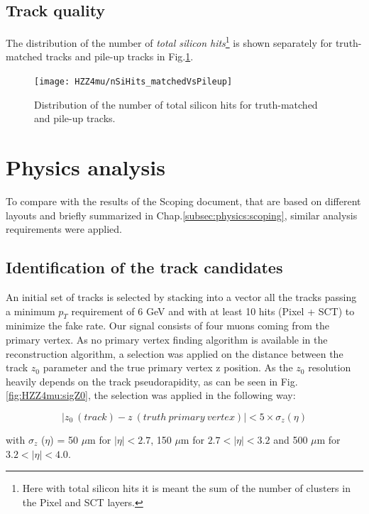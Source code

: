 \documentclass[a4paper,twoside,12pt]{book}
\begin{document}
\subsection*{Track quality}
The distribution of the number of \textit{total silicon hits}\footnote{Here with total silicon hits it is meant the sum of the number
of clusters in the Pixel and SCT layers.} is shown separately for truth-matched tracks and pile-up tracks in
Fig.\ref{fig:HZZ4mu:trackQuality}.

\begin{figure}
\centering
\texttt{[image: HZZ4mu/nSiHits\_matchedVsPileup]}
\caption{Distribution of the number of total silicon hits for truth-matched and pile-up tracks.}
\label{fig:HZZ4mu:trackQuality}
\end{figure}

\section{Physics analysis}\label{sec:physics:analysis}
To compare with the results of the Scoping document, that 
are based on different layouts and briefly summarized in Chap.\ref{subsec:physics:scoping}, 
similar analysis requirements were applied. \\

\subsection{Identification of the track candidates}
An initial set of tracks is selected by stacking into a vector all the tracks passing a minimum
$p_{T}$ requirement of 6 GeV and with at least 10 hits (Pixel + SCT) to minimize the fake rate. 
Our signal consists
of four muons coming from the primary vertex. As no primary vertex finding algorithm
is available in the reconstruction algorithm, 
a selection was applied on the distance between the track $z_0$ parameter and the true primary vertex
z position. As the 
$z_0$ resolution heavily depends on the track pseudorapidity, as can be seen in Fig.
\ref{fig:HZZ4mu:sigZ0}, the selection was applied in the following way:

\begin{equation*}
|z_0\ (track) - z\ (truth\ primary\ vertex)| < 5 \times \sigma_{z} (\eta)
\end{equation*}

with $\sigma_{z}$ ($\eta$) = 50 $\mu$m for $|\eta| < 2.7$, 150 $\mu$m for $2.7 < |\eta| < 3.2$
and 500 $\mu$m for $3.2 < |\eta| < 4.0$. 
\end{document}
